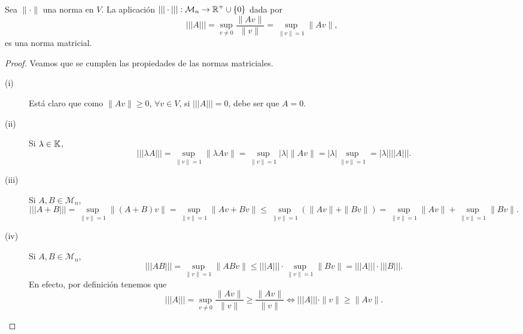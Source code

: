 \documentclass{article}
\begin{document}
\begin{prop}
	Sea $\displaystyle \| \cdot \|  $ una norma en $\displaystyle V $. La aplicación $\displaystyle | | | \cdot | | | : \mathcal{M}_{n} \to \mathbb{R}^{+}\cup \left\{ 0\right\}  $ dada por 
	\[ | | | A | | | = \sup_{v \neq 0}\frac{\| Av \|}{\|v\|} = \sup_{\|v\|=1}\|Av\| ,\]
	es una norma matricial.
\end{prop}
\begin{proof}
Veamos que se cumplen las propiedades de las normas matriciales.
\begin{description}
\item[(i)] Está claro que como $\displaystyle \| A v\| \geq 0 $, $\displaystyle \forall v \in V $, si $\displaystyle | | | A | | | = 0 $, debe ser que $\displaystyle A = 0$.
\item[(ii)] Si $\displaystyle \lambda \in \mathbb{K} $, 
	\[| | | \lambda A | | | = \sup_{\|v\| = 1}\|\lambda Av\| = \sup_{\|v\| = 1} \left|\lambda \right|\|Av\| = \left|\lambda \right|\sup_{\|v\| = 1} = \left|\lambda \right| | | | A | | | .\]
\item[(iii)] Si $\displaystyle A,B \in \mathcal{M}_{n} $,
	\[ | | | A + B | | | = \sup_{\|v\| = 1}\| \left(A + B\right) v \| = \sup_{\|v\| = 1} \| A v + Bv \| \leq \sup_{\|v\| = 1}\left(\|Av\|+\|Bv\|\right) = \sup_{\|v\| = 1}\|Av\| + \sup_{\|v\| = 1}\|Bv\| .\]
\item[(iv)] Si $\displaystyle A,B \in \mathcal{M}_{n} $,
	\[| | | AB | | | = \sup_{\|v\| = 1}\|ABv\| \leq | | | A | | | \cdot \sup_{\|v\| = 1}\|Bv\| = | | | A | | | \cdot | | | B | | | .\]
	En efecto, por definición tenemos que 
	\[ | | | A | | | = \sup_{v \neq 0}\frac{\|Av\|}{\|v\|} \geq \frac{\|Av\|}{\|v\|} \iff | | | A | | | \cdot \|v\| \geq \|Av\| .\]
\end{description}
\end{proof}
\end{document}
